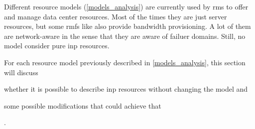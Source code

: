 Different resource models (\autoref{models_analysis}) are currently used by \glspl{rm} to offer and manage data center resources.
Most of the times they are just server resources, but some \glspl{rmf} like \cite{kraken, cloudmirror, oktopus} also provide bandwidth provisioning.
A lot of them are network-aware in the sense that they are aware of failuer domains.
Still, no model consider pure \gls{inp} resources.

For each resource model previously described in \autoref{models_analysis}, this section will discuss
\begin{mylist}
    \item whether it is possible to describe \gls{inp} resources without changing the model and
    \item some possible modifications that could achieve that
\end{mylist}.